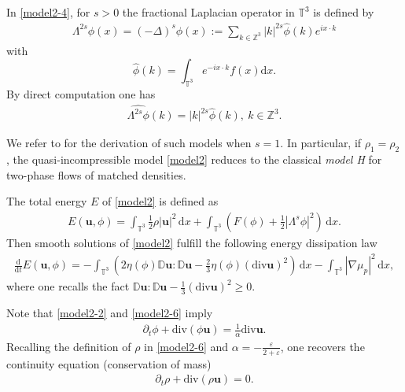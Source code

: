 \documentclass[reqno,a4paper,11pt]{amsart}
\theoremstyle{plain}
\numberwithin{equation}{section}
\newcommand{\bb}[1]{\mathbb{#1}}
\newcommand{\bbt}{\bb{T}}
\renewcommand{\d}{\mathrm{d}}
\begin{document}
	In \eqref{model2-4}, for $s > 0$  the fractional Laplacian operator in $\bbt^3$ is defined by
	\begin{align*}
		\Lambda^{2s}\phi(x)=(-\Delta)^{s}\phi(x):=\sum_{k\in \mathbb{Z}^3} |k|^{2s}\widehat{\phi}(k)e^{ix\cdot k}
	\end{align*}
	with
	$$
	\widehat{\phi}(k)=\int_{\mathbb{T}^{3}}e^{-ix\cdot k}f(x)\d x.
	$$
	By direct computation one has 
	\begin{align*}
		\widehat{\Lambda^{2s}\phi}(k)=|k|^{2s}\widehat{\phi}(k),\ k\in \mathbb{Z}^3.
	\end{align*}
	
	We refer to \cite{GCLLJ,SYW,SRSvBvdZ2018,MKID} for the derivation of such models when $s=1$. In particular, if  $\rho_1 = \rho_2 $, the quasi-incompressible model \eqref{model2} reduces to the classical \textit{model H} \cite{GPV1996,HH} for two-phase flows of matched densities.
	
	
	The total energy $E$ of \eqref{model2} is defined as
	\begin{align}
		\label{Etot}
		E(\mathbf{u}, \phi)
		=\int_{\mathbb{T}^{3}}\frac{1}{2}\rho|\mathbf{u}|^2\, \mathrm{d} x+\int_{\mathbb{T}^{3}} \left( F(\phi)+\frac{1}{2}|\Lambda^{s} \phi|^2\right)\, \mathrm dx.
	\end{align}
	Then smooth solutions of \eqref{model2} fulfill the following energy dissipation law
	\begin{align}\label{ConEnL}
		\frac{\mathrm d}{\mathrm dt}E(\mathbf{u}, \phi)
		=
		-\int_{\mathbb{T}^{3}} \left( 2 \eta(\phi)
		\mathbb{D}\mathbf{u}:\mathbb{ D}\mathbf{u}-\frac{2}{3}\eta(\phi) (\mathrm{div} \mathbf{u})^2\right)\, \mathrm{d} x
		-\int_{\mathbb{T}^{3}} |\nabla \mu_p|^2\, \mathrm{d} x,
	\end{align}
	where one recalls the fact 
	$
	\mathbb{ D}\mathbf{u}:\mathbb{ D}\mathbf{u}-\frac{1}{3}(\mathrm{div} \mathbf{u})^2
	\geq 0.
	$
	
	
	
	Note that \eqref{model2-2} and \eqref{model2-6} imply
	\begin{align*}
		\partial_t\phi + \mathrm{div}(\phi  \mathbf{u})=\frac{1}{\alpha} \mathrm{div}\mathbf{u}.
	\end{align*}
	Recalling the definition of $\rho$ in \eqref{model2-6} and $\alpha=-\frac{\varepsilon}{2+\varepsilon}$, one recovers  the continuity equation (conservation of mass) \cite{AH,SRSvBvdZ2018}
	\begin{align*}
		\partial_t \rho+\mathrm{div} (\rho \mathbf{u})=0.
	\end{align*}
	
\end{document}
